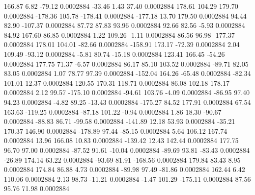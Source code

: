       166.87        6.82      -79.12     0.0002884
      -33.46        1.43       37.40     0.0002884
      178.61      104.29      179.70     0.0002884
     -178.36      105.78     -178.41     0.0002884
     -177.18       13.70      179.50     0.0002884
       94.44       82.90     -107.37     0.0002884
       87.72       87.83       93.96     0.0002884
       92.66       82.56       -5.93     0.0002884
       84.92      167.60       86.85     0.0002884
        1.22      109.26       -1.11     0.0002884
       86.56       96.98     -177.37     0.0002884
      178.01      104.01      -82.66     0.0002884
     -158.91      173.17      -72.39     0.0002884
        2.04      109.49      -93.12     0.0002884
       -5.81       80.74      -15.18     0.0002884
      123.41      166.45      -54.26     0.0002884
      177.75       71.37       -6.57     0.0002884
       86.17       85.10      103.52     0.0002884
      -89.71       82.05       83.05     0.0002884
        1.07       78.77       97.39     0.0002884
     -152.04      164.26      -65.48     0.0002884
      -82.34      101.01       12.37     0.0002884
      120.55      170.31      118.71     0.0002884
       86.08      102.18      178.17     0.0002884
        2.12       99.57     -175.10     0.0002884
      -94.61      103.76       -4.09     0.0002884
      -86.95       97.40       94.23     0.0002884
       -4.82       89.25      -13.43     0.0002884
     -175.27       84.52      177.91     0.0002884
       67.54      163.63     -119.25     0.0002884
      -87.18      101.22       -0.94     0.0002884
        1.86       18.30      -90.67     0.0002884
      -88.83       86.71      -99.58     0.0002884
     -141.89       12.18       53.93     0.0002884
      -35.21      170.37      146.90     0.0002884
     -178.89       97.44      -85.15     0.0002884
        5.64      106.12      167.74     0.0002884
       13.96      166.08       10.83     0.0002884
     -139.42       12.43      142.44     0.0002884
      177.75       96.70       97.00     0.0002884
      -87.52       91.61      -10.04     0.0002884
      -89.69       93.81      -83.43     0.0002884
      -26.89      174.14       63.22     0.0002884
      -93.69       81.91     -168.56     0.0002884
      179.84       83.43        8.95     0.0002884
      174.84       86.88        4.73     0.0002884
      -89.98       97.49      -81.86     0.0002884
      162.44        6.42      110.06     0.0002884
        2.13       98.73      -11.21     0.0002884
       -1.47      101.29     -175.11     0.0002884
       87.56       95.76       71.98     0.0002884
